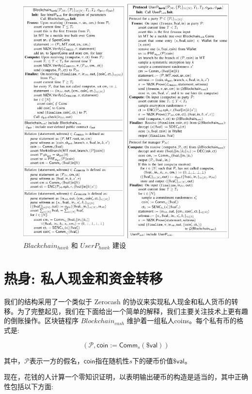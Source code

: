 \documentclass{xduugtrans}
\begin{document}
\begin{figure}
    \centering
    \includegraphics[width=1.0\linewidth]{6}
    \caption{$Blackchain_{hawk}$ 和 $UserP_{hawk}$ 建设}
    \label{fig6}
\end{figure}

\section{热身: 私人现金和资金转移}

我们的结构采用了一个类似于 Zerocash 的协议来实现私人现金和私人货币的转移。为了完整起见，我们在下面给出一个简单的解释，我们主要关注技术上更有趣的倒账操作。区块链程序 $Blockchain_{cash}$ 维护着一组私人coins。每个私有币的格式是:

\begin{equation}
    (\mathcal{P},\mathsf{coin}:=\mathsf{Comm}_{s}(\$\mathsf{val}))
\end{equation}

其中，$\mathcal{P}$表示一方的假名，$\mathsf{coin}$指在随机性$s$下的硬币价值$\$\mathsf{val}$。

现在，花钱的人计算一个零知识证明，以表明输出硬币的构造是适当的，其中正确性包括以下方面:
\end{document}
